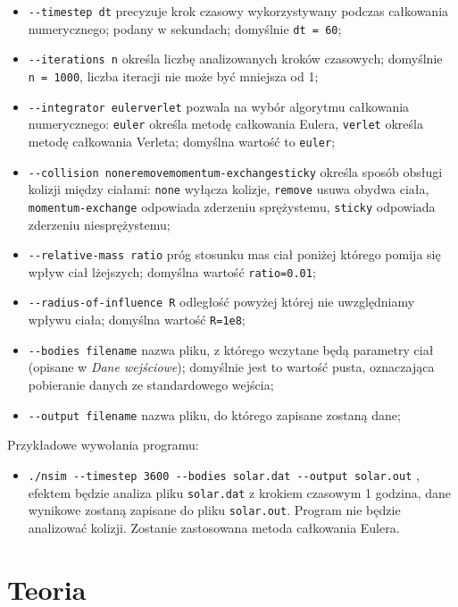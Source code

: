 \documentclass[]{article}
\begin{document}
\begin{itemize}
\item
  \texttt{-\/-timestep\ dt} precyzuje krok czasowy wykorzystywany
  podczas całkowania numerycznego; podany w sekundach; domyślnie
  \texttt{dt\ =\ 60};
\item
  \texttt{-\/-iterations\ n} określa liczbę analizowanych kroków
  czasowych; domyślnie \texttt{n\ =\ 1000}, liczba iteracji nie może być
  mniejsza od 1;
\item
  \texttt{-\/-integrator\ euler\textbar{}verlet} pozwala na wybór
  algorytmu całkowania numerycznego: \texttt{euler} określa metodę
  całkowania Eulera, \texttt{verlet} określa metodę całkowania Verleta;
  domyślna wartość to \texttt{euler};
\item
  \texttt{-\/-collision\ none\textbar{}remove\textbar{}momentum-exchange\textbar{}sticky}
  określa sposób obsługi kolizji między ciałami: \texttt{none} wyłącza
  kolizje, \texttt{remove} usuwa obydwa ciała,
  \texttt{momentum-exchange} odpowiada zderzeniu sprężystemu,
  \texttt{sticky} odpowiada zderzeniu niesprężystemu;
\item
  \texttt{-\/-relative-mass\ ratio} próg stosunku mas ciał poniżej
  którego pomija się wpływ ciał lżejszych; domyślna wartość
  \texttt{ratio=0.01};
\item
  \texttt{-\/-radius-of-influence\ R} odległość powyżej której nie
  uwzględniamy wpływu ciała; domyślna wartość \texttt{R=1e8};
\item
  \texttt{-\/-bodies\ filename} nazwa pliku, z którego wczytane będą
  parametry ciał (opisane w \emph{Dane wejściowe}); domyślnie jest to
  wartość pusta, oznaczająca pobieranie danych ze standardowego wejścia;
\item
  \texttt{-\/-output\ filename} nazwa pliku, do którego zapisane zostaną
  dane;
\end{itemize}

Przykładowe wywołania programu:

\begin{itemize}
\item
  \texttt{./nsim\ -\/-timestep\ 3600\ -\/-bodies\ solar.dat\ -\/-output\ solar.out}
  , efektem będzie analiza pliku \texttt{solar.dat} z krokiem czasowym 1
  godzina, dane wynikowe zostaną zapisane do pliku \texttt{solar.out}.
  Program nie będzie analizować kolizji. Zostanie zastosowana metoda
  całkowania Eulera. 
\end{itemize}

\section{Teoria}\label{header-n279}
\end{document}

